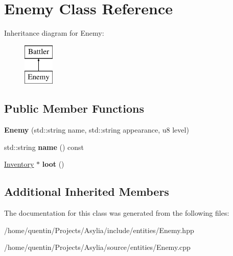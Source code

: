 \hypertarget{classEnemy}{\section{Enemy Class Reference}
\label{classEnemy}
}
Inheritance diagram for Enemy\-:\begin{figure}[H]
\begin{center}
\leavevmode
\includegraphics[height=2.000000cm]{classEnemy}
\end{center}
\end{figure}
\subsection*{Public Member Functions}
\begin{DoxyCompactItemize}
\item 
\hypertarget{classEnemy_abf3e5de61b887b9e47968a80e62d1d5d}{{\bfseries Enemy} (std\-::string name, std\-::string appearance, u8 level)}\label{classEnemy_abf3e5de61b887b9e47968a80e62d1d5d}

\item 
\hypertarget{classEnemy_a2043cec6e9e6df1cf75ab2317259bd2a}{std\-::string {\bfseries name} () const }\label{classEnemy_a2043cec6e9e6df1cf75ab2317259bd2a}

\item 
\hypertarget{classEnemy_a79fae600a3aa99ed9b108e0b79d062d5}{\hyperlink{classInventory}{Inventory} $\ast$ {\bfseries loot} ()}\label{classEnemy_a79fae600a3aa99ed9b108e0b79d062d5}

\end{DoxyCompactItemize}
\subsection*{Additional Inherited Members}


The documentation for this class was generated from the following files\-:\begin{DoxyCompactItemize}
\item 
/home/quentin/\-Projects/\-Asylia/include/entities/Enemy.\-hpp\item 
/home/quentin/\-Projects/\-Asylia/source/entities/Enemy.\-cpp\end{DoxyCompactItemize}
